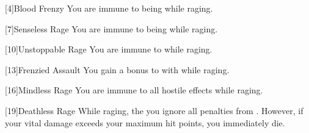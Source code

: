         [4]{Blood Frenzy}
        You are immune to being  while raging.

        [7]{Senseless Rage}
        You are immune to being  while raging.

        [10]{Unstoppable Rage}
        You are immune to   while raging.

        [13]{Frenzied Assault}
        You gain a  bonus to  with  while raging.

        [16]{Mindless Rage} 
        You are immune to all hostile  effects while raging.

        [19]{Deathless Rage} 
        While raging, the you ignore all penalties from .
        However, if your vital damage exceeds your maximum hit points, you immediately die.

